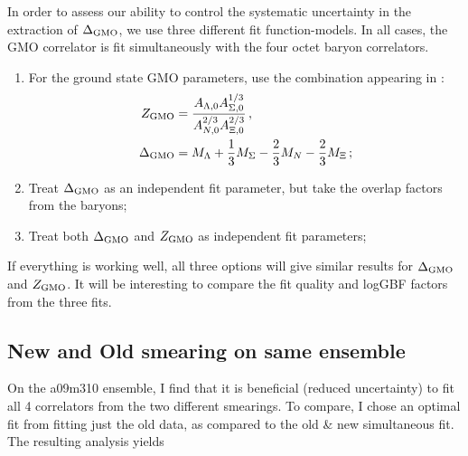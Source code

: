 \documentclass[prd,tightenlines,preprintnumbers,showpacs,superscriptaddress,notitlepage,nofootinbib,eqsecnum,floatfix,notitlepage]{revtex4-1}
\begin{document}
In order to assess our ability to control the systematic uncertainty in the extraction of ${\Delta}_{\rm GMO}$, we use three different fit function-models.  In all cases, the GMO correlator is fit simultaneously with the four octet baryon correlators.
\begin{enumerate}
\item For the ground state GMO parameters, use the combination appearing in :
\begin{align}
Z_{\rm GMO} &= \frac{A_{{\Lambda},0} A_{{\Sigma},0}^{1/3}}{A_{N,0}^{2/3} A_{\Xi,0}^{2/3}}\, ,
\nonumber\\
{\Delta}_{\rm GMO} &= M_{\Lambda} +\frac{1}{3}M_{\Sigma} -\frac{2}{3} M_N -\frac{2}{3} M_\Xi\, ;
\end{align}

\item Treat ${\Delta}_{\rm GMO}$ as an independent fit parameter, but take the overlap factors from the baryons;

\item Treat both ${\Delta}_{\rm GMO}$ and $Z_{\rm GMO}$ as independent fit parameters;
\end{enumerate}
If everything is working well, all three options will give similar results for ${\Delta}_{\rm GMO}$ and $Z_{\rm GMO}$.  It will be interesting to compare the fit quality and logGBF factors from the three fits.






\subsection{New and Old smearing on same ensemble}
On the a09m310 ensemble, I find that it is beneficial (reduced uncertainty) to fit all 4 correlators from the two different smearings.  To compare, I chose an optimal fit from fitting just the old data, as compared to the old \& new simultaneous fit.
The resulting analysis yields
\end{document}
